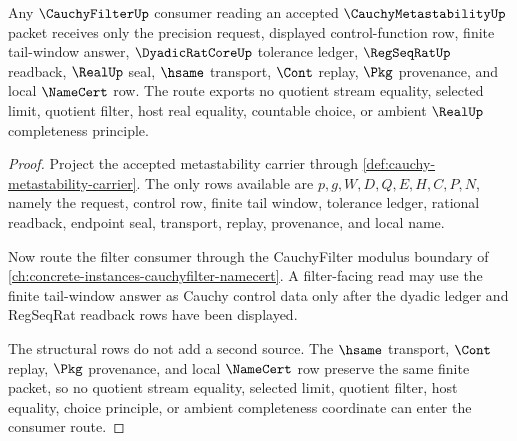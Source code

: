 \begin{theorem}\label{thm:cauchy-metastability-filter-consumer-route}
Any $\CauchyFilterUp$ consumer reading an accepted $\CauchyMetastabilityUp$ packet receives only the precision request, displayed control-function row, finite tail-window answer, $\DyadicRatCoreUp$ tolerance ledger, $\RegSeqRatUp$ readback, $\RealUp$ seal, $\hsame$ transport, $\Cont$ replay, $\Pkg$ provenance, and local $\NameCert$ row. The route exports no quotient stream equality, selected limit, quotient filter, host real equality, countable choice, or ambient $\RealUp$ completeness principle.
\end{theorem}
\begin{proof}
Project the accepted metastability carrier through \autoref{def:cauchy-metastability-carrier}. The only rows available are $p,g,W,D,Q,E,H,C,P,N$, namely the request, control row, finite tail window, tolerance ledger, rational readback, endpoint seal, transport, replay, provenance, and local name.

Now route the filter consumer through the CauchyFilter modulus boundary of \autoref{ch:concrete-instances-cauchyfilter-namecert}. A filter-facing read may use the finite tail-window answer as Cauchy control data only after the dyadic ledger and RegSeqRat readback rows have been displayed.

The structural rows do not add a second source. The $\hsame$ transport, $\Cont$ replay, $\Pkg$ provenance, and local $\NameCert$ row preserve the same finite packet, so no quotient stream equality, selected limit, quotient filter, host equality, choice principle, or ambient completeness coordinate can enter the consumer route.
\end{proof}


\begin{closurestatus}{\CauchyMetastabilityUp}
  \theoryclosure{\seedClosure}
  \formalstatus{\unformalizedV}
\end{closurestatus}
